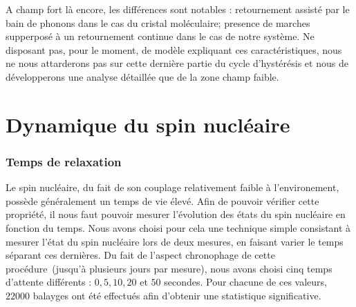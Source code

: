 A champ fort là encore, les différences sont notables : retournement assisté par le bain de phonons dans le cas du cristal moléculaire; presence  de marches supperposé à un retournement continue dans le cas de notre système. Ne disposant pas, pour le moment, de modèle expliquant ces caractéristiques, nous ne nous attarderons pas sur cette dernière partie du cycle d’hystérésis et nous de développerons une analyse détaillée que de la zone champ faible.


\section{Dynamique du spin nucléaire}


\subsubsection{Temps de relaxation}
Le spin nucléaire, du fait de son couplage relativement faible à l'environement, possède généralement un temps de vie élevé. Afin de pouvoir vérifier cette propriété, il nous faut pouvoir mesurer l'évolution des états du spin nucléaire en fonction du temps. Nous avons choisi pour cela une technique simple consistant à mesurer l'état du spin nucléaire lors de deux mesures, en faisant varier le temps séparant ces dernières. Du fait de l'aspect chronophage de cette procédure~(jusqu'à plusieurs jours par mesure), nous avons choisi cinq temps d'attente différents : $0,5,10,20$ et $50$ secondes. Pour chacune de ces valeurs, $22000$ balayges ont été effectués afin d'obtenir une statistique significative.


